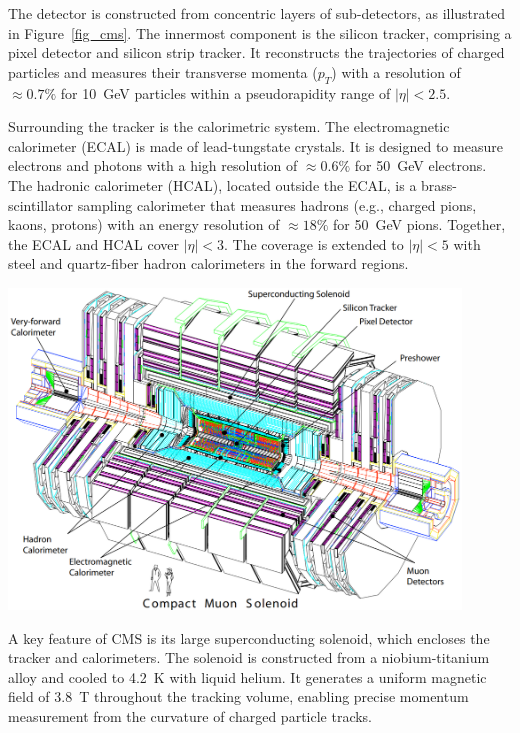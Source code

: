 The detector is constructed from concentric layers of sub-detectors, as illustrated in Figure~\ref{fig_cms}. The innermost component is the silicon tracker, comprising a pixel detector and silicon strip tracker. It reconstructs the trajectories of charged particles and measures their transverse momenta ($p_T$) with a resolution of $\approx 0.7\%$ for 10~GeV particles within a pseudorapidity range of $|\eta| < 2.5$.

Surrounding the tracker is the calorimetric system. The electromagnetic calorimeter (ECAL) is made of lead-tungstate crystals. It is designed to measure electrons and photons with a high resolution of $\approx 0.6\%$ for 50~GeV electrons. The hadronic calorimeter (HCAL), located outside the ECAL, is a brass-scintillator sampling calorimeter that measures hadrons (e.g., charged pions, kaons, protons) with an energy resolution of $\approx 18\%$ for 50~GeV pions. Together, the ECAL and HCAL cover $|\eta| < 3$. The coverage is extended to $|\eta| < 5$ with steel and quartz-fiber hadron calorimeters in the forward regions.


\begin{center}
	\includegraphics[width=0.9\textwidth]{Images/CMS.png}
	\label{fig_cms}
\end{center}

A key feature of CMS is its large superconducting solenoid, which encloses the tracker and calorimeters. The solenoid is constructed from a niobium-titanium alloy and cooled to 4.2~K with liquid helium. It generates a uniform magnetic field of 3.8~T throughout the tracking volume, enabling precise momentum measurement from the curvature of charged particle tracks.


